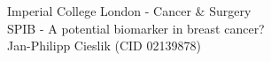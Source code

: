 \documentclass[12pt,a4paper]{article}
\begin{document}
\begin{titlepage}
	\centering
	{Imperial College London - Cancer \& Surgery}\\
	\vspace{12cm}
	{SPIB - A potential biomarker in breast cancer?}\\
	\vspace{3cm}
	Jan-Philipp Cieslik (CID 02139878) \\
    
\end{titlepage}

\newpage
\justifying
{} 












\newpage
  

\newpage
{} 
\end{document}
